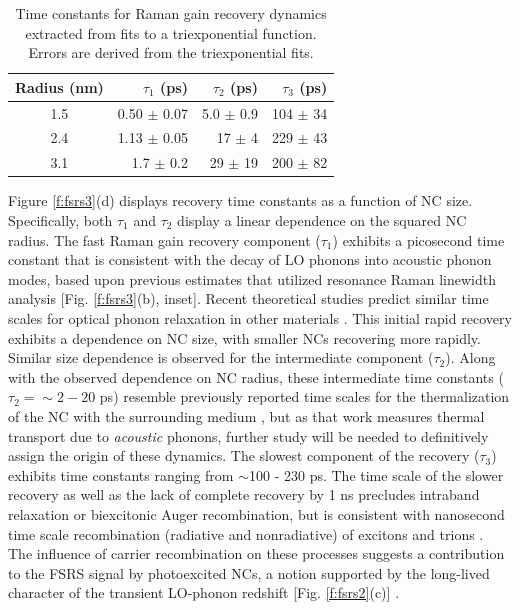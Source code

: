 \begin{table}
\caption{Time constants for Raman gain recovery dynamics extracted from fits to a triexponential function. Errors are derived from the triexponential fits.}
\centering
\begin{tabular}{c r r r}
\hline\hline
Radius (nm) & $\tau_1$ (ps) & $\tau_2$ (ps) & $\tau_3$ (ps) \\
\hline
1.5 & 0.50 $\pm$ 0.07 & 5.0 $\pm$ 0.9 & 104 $\pm$ 34 \\
2.4 & 1.13 $\pm$ 0.05 & 17 $\pm$ 4 & 229 $\pm$ 43 \\
3.1 & 1.7 $\pm$ 0.2 & 29 $\pm$ 19 & 200 $\pm$ 82 \\
\hline
\end{tabular}
\label{table:fsrsT1}
\end{table}

Figure \ref{f:fsrs3}(d) displays recovery time constants as a function of NC size. Specifically, both $\tau_1$ and $\tau_2$ display a linear dependence on the squared NC radius. The fast Raman gain recovery component ($\tau_1$) exhibits a picosecond time constant that is consistent with the decay of LO phonons into acoustic phonon modes, based upon previous estimates that utilized resonance Raman linewidth analysis \cite{:/content/aip/journal/jcp/98/11/10.1063/1.464501} [Fig. \ref{f:fsrs3}(b), inset].  Recent theoretical studies predict similar time scales for optical phonon relaxation in other materials \cite{0295-5075-101-1-16001}.  This initial rapid recovery exhibits a dependence on NC size, with smaller NCs recovering more rapidly. Similar size dependence is observed for the intermediate component ($\tau_2$).  Along with the observed dependence on NC radius, these intermediate time constants ($\tau_2 = \sim 2 - 20$ ps) resemble previously reported time scales for the thermalization of the NC with the surrounding medium \cite{PhysRevLett.107.177403}, but as that work measures thermal transport due to \emph{acoustic} phonons, further study will be needed to definitively assign the origin of these dynamics. The slowest component of the recovery ($\tau_3$) exhibits time constants ranging from $\sim$100 - 230 ps.  The time scale of the slower recovery as well as the lack of complete recovery by 1 ns precludes intraband relaxation or biexcitonic Auger recombination, but is consistent with nanosecond time scale recombination (radiative and nonradiative) of excitons and trions \cite{:/content/aip/journal/apl/82/17/10.1063/1.1570923, doi:10.1021/nn9001177}.  The influence of carrier recombination on these processes suggests a contribution to the FSRS signal by photoexcited NCs, a notion supported by the long-lived character of the transient LO-phonon redshift [Fig. \ref{f:fsrs2}(c)] \cite{PhysRevLett.80.3105}. \par


